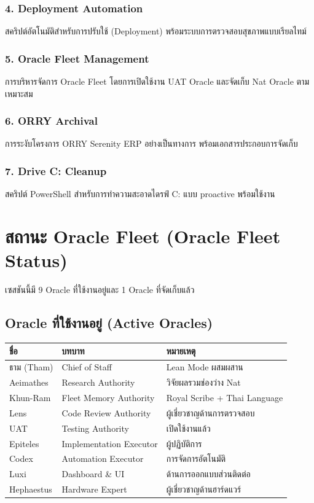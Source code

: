 \documentclass[11pt]{article}
\begin{document}
\subsubsection{4. Deployment Automation}
สคริปต์อัตโนมัติสำหรับการปรับใช้ (Deployment) พร้อมระบบการตรวจสอบสุขภาพแบบเรียลไทม์

\subsubsection{5. Oracle Fleet Management}
การบริหารจัดการ Oracle Fleet โดยการเปิดใช้งาน UAT Oracle และจัดเก็บ Nat Oracle ตามเหมาะสม

\subsubsection{6. ORRY Archival}
การระงับโครงการ ORRY Serenity ERP อย่างเป็นทางการ พร้อมเอกสารประกอบการจัดเก็บ

\subsubsection{7. Drive C: Cleanup}
สคริปต์ PowerShell สำหรับการทำความสะอาดไดรฟ์ C: แบบ proactive พร้อมใช้งาน

\section{สถานะ Oracle Fleet (Oracle Fleet Status)}

เซสชันนี้มี 9 Oracle ที่ใช้งานอยู่และ 1 Oracle ที่จัดเก็บแล้ว

\subsection{Oracle ที่ใช้งานอยู่ (Active Oracles)}

\begin{center}
\begin{tabularx}{\textwidth}{|l|l|X|}
    \hline
    \textbf{ชื่อ} & \textbf{บทบาท} & \textbf{หมายเหตุ} \\
    \hline
    ธาม (Tham) & Chief of Staff & Lean Mode ผสมผสาน \\
    \hline
    Aeimathes & Research Authority & วิจัยผลรวมช่องว่าง Nat \\
    \hline
    Khun-Ram & Fleet Memory Authority & Royal Scribe + Thai Language \\
    \hline
    Lens & Code Review Authority & ผู้เชี่ยวชาญด้านการตรวจสอบ \\
    \hline
    UAT & Testing Authority & เปิดใช้งานแล้ว \\
    \hline
    Epiteles & Implementation Executor & ผู้ปฏิบัติการ \\
    \hline
    Codex & Automation Executor & การจัดการอัตโนมัติ \\
    \hline
    Luxi & Dashboard \& UI & ด้านการออกแบบส่วนติดต่อ \\
    \hline
    Hephaestus & Hardware Expert & ผู้เชี่ยวชาญด้านฮาร์ดแวร์ \\
    \hline
\end{tabularx}
\end{center}
\end{document}
